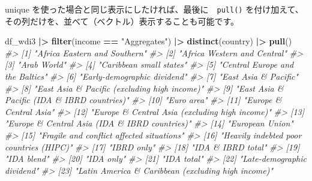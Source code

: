\documentclass[
  xelatex, ja=standard]{bxjsbook}
\newenvironment{Shaded}{\begin{snugshade}}{\end{snugshade}}
\newcommand{\CommentTok}[1]{\textcolor[rgb]{0.56,0.35,0.01}{\textit{#1}}}
\newcommand{\FunctionTok}[1]{\textcolor[rgb]{0.13,0.29,0.53}{\textbf{#1}}}
\newcommand{\NormalTok}[1]{#1}
\newcommand{\SpecialCharTok}[1]{\textcolor[rgb]{0.81,0.36,0.00}{\textbf{#1}}}
\newcommand{\StringTok}[1]{\textcolor[rgb]{0.31,0.60,0.02}{#1}}
\theoremstyle{definition}
\theoremstyle{definition}
\theoremstyle{definition}
\theoremstyle{definition}
\theoremstyle{remark}
\begin{document}
unique を使った場合と同じ表示にしたければ、最後に　\texttt{pull()} を付け加えて、その列だけを、並べて（ベクトル）表示することも可能です。

\begin{Shaded}
\begin{Highlighting}[]
\NormalTok{df\_wdi3 }\SpecialCharTok{|\textgreater{}} \FunctionTok{filter}\NormalTok{(income }\SpecialCharTok{==} \StringTok{"Aggregates"}\NormalTok{) }\SpecialCharTok{|\textgreater{}} \FunctionTok{distinct}\NormalTok{(country) }\SpecialCharTok{|\textgreater{}} \FunctionTok{pull}\NormalTok{()}
\CommentTok{\#\textgreater{}  [1] "Africa Eastern and Southern"                         }
\CommentTok{\#\textgreater{}  [2] "Africa Western and Central"                          }
\CommentTok{\#\textgreater{}  [3] "Arab World"                                          }
\CommentTok{\#\textgreater{}  [4] "Caribbean small states"                              }
\CommentTok{\#\textgreater{}  [5] "Central Europe and the Baltics"                      }
\CommentTok{\#\textgreater{}  [6] "Early{-}demographic dividend"                          }
\CommentTok{\#\textgreater{}  [7] "East Asia \& Pacific"                                 }
\CommentTok{\#\textgreater{}  [8] "East Asia \& Pacific (excluding high income)"         }
\CommentTok{\#\textgreater{}  [9] "East Asia \& Pacific (IDA \& IBRD countries)"          }
\CommentTok{\#\textgreater{} [10] "Euro area"                                           }
\CommentTok{\#\textgreater{} [11] "Europe \& Central Asia"                               }
\CommentTok{\#\textgreater{} [12] "Europe \& Central Asia (excluding high income)"       }
\CommentTok{\#\textgreater{} [13] "Europe \& Central Asia (IDA \& IBRD countries)"        }
\CommentTok{\#\textgreater{} [14] "European Union"                                      }
\CommentTok{\#\textgreater{} [15] "Fragile and conflict affected situations"            }
\CommentTok{\#\textgreater{} [16] "Heavily indebted poor countries (HIPC)"              }
\CommentTok{\#\textgreater{} [17] "IBRD only"                                           }
\CommentTok{\#\textgreater{} [18] "IDA \& IBRD total"                                    }
\CommentTok{\#\textgreater{} [19] "IDA blend"                                           }
\CommentTok{\#\textgreater{} [20] "IDA only"                                            }
\CommentTok{\#\textgreater{} [21] "IDA total"                                           }
\CommentTok{\#\textgreater{} [22] "Late{-}demographic dividend"                           }
\CommentTok{\#\textgreater{} [23] "Latin America \& Caribbean (excluding high income)"   }

\end{Highlighting}
\end{Shaded}
\end{document}
